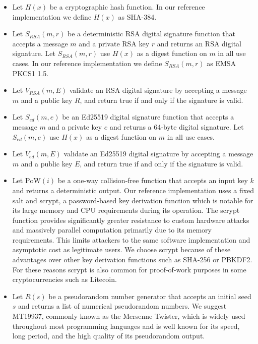 \begin{itemize}
	\item Let $ H(x) $ be a cryptographic hash function. In our reference implementation we define $ H(x) $ as SHA-384.
	\item Let $ S_{\mathit{RSA}}(m, r) $ be a deterministic RSA digital signature function that accepts a message $ m $ and a private RSA key $ r $ and returns an RSA digital signature. Let $ S_{\mathit{RSA}}(m, r) $ use $ H(x) $ as a digest function on $ m $ in all use cases. In our reference implementation we define $ S_{\mathit{RSA}}(m, r) $ as EMSA PKCS1 1.5.
	\item Let $ V_{\mathit{RSA}}(m, E) $ validate an RSA digital signature by accepting a message $ m $ and a public key $ R $, and return true if and only if the signature is valid.
	\item Let $ S_{\mathit{ed}}(m, e) $ be an Ed25519 digital signature function that accepts a message $ m $ and a private key $ e $ and returns a 64-byte digital signature. Let $ S_{\mathit{ed}}(m, e) $ use $ H(x) $ as a digest function on $ m $ in all use cases.
	\item Let $ V_{\mathit{ed}}(m, E) $ validate an Ed25519 digital signature by accepting a message $ m $ and a public key $ E $, and return true if and only if the signature is valid.
	\item Let $ \mathrm{PoW}(i) $ be a one-way collision-free function that accepts an input key $ k $ and returns a deterministic output. Our reference implementation uses a fixed salt and scrypt, a password-based key derivation function which is notable for its large memory and CPU requirements during its operation. The scrypt function provides significantly greater resistance to custom hardware attacks and massively parallel computation primarily due to its memory requirements. This limits attackers to the same software implementation and asymptotic cost as legitimate users\cite{percival2009stronger}\cite{percival2012scrypt}. We choose scrypt because of these advantages over other key derivation functions such as SHA-256 or PBKDF2. For these reasons scrypt is also common for proof-of-work purposes in some cryptocurrencies such as Litecoin.
	\item Let $ \mathit{R}(s) $ be a pseudorandom number generator that accepts an initial seed $ s $ and returns a list of numerical pseudorandom numbers. We suggest MT19937, commonly known as the Mersenne Twister, which is widely used throughout most programming languages and is well known for its speed, long period, and the high quality of its pseudorandom output\cite{matsumoto1998mersenne}.
\end{itemize}

